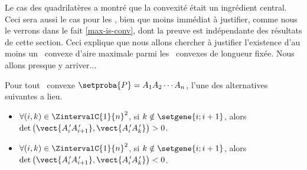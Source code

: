 Le cas des quadrilatères a montré que la convexité était un ingrédient central. Ceci sera aussi le cas pour les \ngones, bien que moins immédiat à justifier, comme nous le verrons dans le fait \ref{max-is-conv}, dont la preuve est indépendante des résultats de cette section.
%
Ceci explique que nous allons chercher à justifier l'existence d'au moins un \ngone\ convexe d'aire maximale parmi les \ngones\ convexes de longueur fixée. Nous allons presque y arriver...




\begin{fact} \label{conv-pos-det}
    Pour tout \ngone\ convexe $\setproba{P} = A_1 A_2 \cdots A_n$, l'une des alternatives suivantes a lieu.
	\begin{itemize}
		\item $\forall (i, k) \in \ZintervalC{1}{n}^2$,
		si $k \notin \setgene{i ; i+1}$, alors
		$\det \big( \vect{\primeit{A}_i \primeit{A}_{i+1}}, \vect{\primeit{A}_i \primeit{A}_k} \big) > 0$.

		\item $\forall (i, k) \in \ZintervalC{1}{n}^2$,
		si $k \notin \setgene{i ; i+1}$, alors
		$\det \big( \vect{\primeit{A}_i \primeit{A}_{i+1}}, \vect{\primeit{A}_i \primeit{A}_k} \big) < 0$.
    \end{itemize}
\end{fact}


